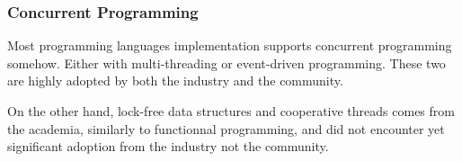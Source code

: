 



\subsubsection{Concurrent Programming}

Most programming languages implementation supports concurrent programming somehow.
Either with multi-threading or event-driven programming.
These two are highly adopted by both the industry and the community.

On the other hand, lock-free data structures and cooperative threads comes from the academia, similarly to functionnal programming, and did not encounter yet significant adoption from the industry not the community.

